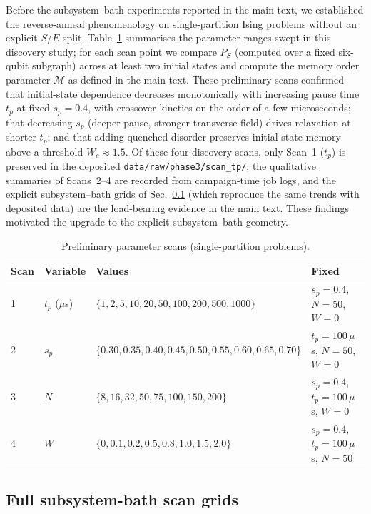 \documentclass[aps,prapplied,reprint,superscriptaddress,floatfix,nofootinbib]{revtex4-2}
\begin{document}
Before the subsystem--bath experiments reported in the main text, we established the reverse-anneal phenomenology on single-partition Ising problems without an explicit $S$/$E$ split.
Table~\ref{tab:phase3} summarises the parameter ranges swept in this discovery study; for each scan point we compare $P_S$ (computed over a fixed six-qubit subgraph) across at least two initial states and compute the memory order parameter $\mathcal{M}$ as defined in the main text.
These preliminary scans confirmed that initial-state dependence decreases monotonically with increasing pause time $t_p$ at fixed $s_p=0.4$, with crossover kinetics on the order of a few microseconds; that decreasing $s_p$ (deeper pause, stronger transverse field) drives relaxation at shorter $t_p$; and that adding quenched disorder preserves initial-state memory above a threshold $W_c \approx 1.5$.  Of these four discovery scans, only Scan~1 ($t_p$) is preserved in the deposited \texttt{data/raw/phase3/scan\_tp/}; the qualitative summaries of Scans~2--4 are recorded from campaign-time job logs, and the explicit subsystem--bath grids of Sec.~\ref{sec:phase4} (which reproduce the same trends with deposited data) are the load-bearing evidence in the main text.
These findings motivated the upgrade to the explicit subsystem--bath geometry.

\begin{table}[!htbp]
\centering
\caption{Preliminary parameter scans (single-partition problems).}
\label{tab:phase3}
\small
\begin{tabular}{llll}
\toprule
Scan & Variable & Values & Fixed \\
\midrule
1 & $t_p$ ($\mu$s) & $\{1, 2, 5, 10, 20, 50, 100, 200, 500, 1000\}$ & $s_p=0.4$, $N=50$, $W=0$ \\
2 & $s_p$ & $\{0.30, 0.35, 0.40, 0.45, 0.50, 0.55, 0.60, 0.65, 0.70\}$ & $t_p=100\,\mu$s, $N=50$, $W=0$ \\
3 & $N$ & $\{8, 16, 32, 50, 75, 100, 150, 200\}$ & $s_p=0.4$, $t_p=100\,\mu$s, $W=0$ \\
4 & $W$ & $\{0, 0.1, 0.2, 0.5, 0.8, 1.0, 1.5, 2.0\}$ & $s_p=0.4$, $t_p=100\,\mu$s, $N=50$ \\
\bottomrule
\end{tabular}
\end{table}

\subsection{Full subsystem-bath scan grids}
\label{sec:phase4}
\end{document}
